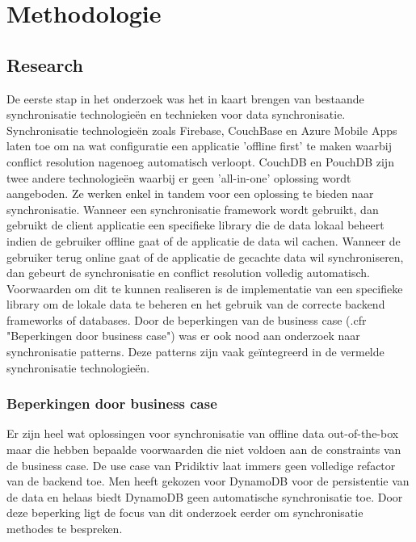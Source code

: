 
\chapter{Methodologie}
\label{ch:methodologie}


\section{Research}
De eerste stap in het onderzoek was het in kaart brengen van bestaande synchronisatie technologie\"en en technieken voor data synchronisatie. Synchronisatie technologie\"en zoals Firebase, CouchBase en Azure Mobile Apps laten toe om na wat configuratie een applicatie 'offline first' te maken waarbij conflict resolution nagenoeg automatisch verloopt. CouchDB en PouchDB zijn twee andere technologie\"en waarbij er geen 'all-in-one' oplossing wordt aangeboden. Ze werken enkel in tandem voor een oplossing te bieden naar synchronisatie. Wanneer een synchronisatie framework wordt gebruikt, dan gebruikt de client applicatie een specifieke library die de data lokaal beheert indien de gebruiker offline gaat of de applicatie de data wil cachen. Wanneer de gebruiker terug online gaat of de applicatie de gecachte data wil synchroniseren, dan gebeurt de synchronisatie en conflict resolution volledig automatisch. Voorwaarden om dit te kunnen realiseren is de implementatie van een specifieke library om de lokale data te beheren en het gebruik van de correcte backend frameworks of databases.
Door de beperkingen van de business case (.cfr "Beperkingen door business case") was er ook nood aan onderzoek naar synchronisatie patterns. Deze patterns zijn vaak ge\"integreerd in de vermelde synchronisatie technologie\"en.
\subsection{Beperkingen door business case}
Er zijn heel wat oplossingen voor synchronisatie van offline data out-of-the-box maar die hebben bepaalde voorwaarden die niet voldoen aan de constraints van de business case. De use case van Pridiktiv laat immers geen volledige refactor van de backend toe. Men heeft gekozen voor DynamoDB voor de persistentie van de data en helaas biedt DynamoDB geen automatische synchronisatie toe. Door deze beperking ligt de focus van dit onderzoek eerder om synchronisatie methodes te bespreken.
